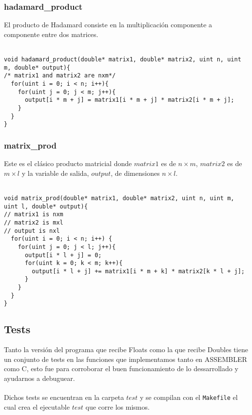 \subsubsection{hadamard\_product}

El producto de Hadamard consiste en la multiplicación componente a componente entre dos matrices.
\\
\\
\begin{lstlisting}[frame=single]
void hadamard_product(double* matrix1, double* matrix2, uint n, uint m, double* output){
/* matrix1 and matrix2 are nxm*/
  for(uint i = 0; i < n; i++){
    for(uint j = 0; j < m; j++){
      output[i * m + j] = matrix1[i * m + j] * matrix2[i * m + j];
    }
  }
}
\end{lstlisting}

\subsubsection{matrix\_prod}

Este es el clásico producto matricial donde $matrix1$ es de $n \times m$, $matrix2$ es de $m \times l$ y la variable de salida, $output$, de dimensiones $n \times l$.
\\
\\
\begin{lstlisting}[frame=single,xleftmargin=1cm]
void matrix_prod(double* matrix1, double* matrix2, uint n, uint m, uint l, double* output){
// matrix1 is nxm
// matrix2 is mxl
// output is nxl
  for(uint i = 0; i < n; i++) {
    for(uint j = 0; j < l; j++){
      output[i * l + j] = 0;
      for(uint k = 0; k < m; k++){
        output[i * l + j] += matrix1[i * m + k] * matrix2[k * l + j];
      }
    }
  }
}
\end{lstlisting}


\subsection{Tests}

Tanto la versión del programa que recibe Floats como la que recibe Doubles tiene un conjunto de tests en las funciones que implementamos tanto en ASSEMBLER como C, esto fue para corroborar el buen funcionamiento de lo dessarrollado y ayudarnos a debuguear.
\\
\\
Dichos tests se encuentran en la carpeta $test$ y se compilan con el \texttt{Makefile} el cual crea el ejecutable $test$ que corre los mismos.